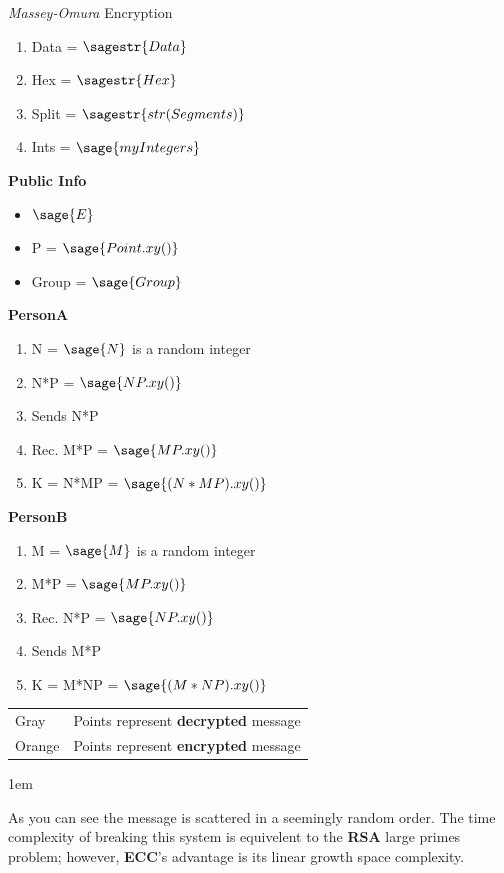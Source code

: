 \documentclass[a0,portrait]{a0poster}
\begin{document}
\begin{multicols}{2}
\begin{slide}{{\em Massey-Omura} Encryption}
\begin{enumerate}
  \item Data = \(\sagestr{Data}\)
  \item Hex =  \(\sagestr{Hex}\)
  \item Split =  \(\sagestr{str(Segments)}\)
  \item Ints = \(\sage{myIntegers}\)
\end{enumerate}
{\bf Public Info}
\begin{itemize}
\item $ \sage{E} $
\item P = $\sage{Point.xy()}$
\item Group = $\sage{Group}$
\end{itemize}
\begin{multicols}{2}
{\bf PersonA}
{\normalsize
\begin{enumerate}
\item N = $\sage{N}$ is a random integer
\item N*P = $\sage{NP.xy()}$
\item Sends N*P
\item Rec. M*P = $\sage{MP.xy()}$
\item K = N*MP =  $\sage{(N*MP).xy()}$
\end{enumerate}}
{\bf PersonB}
{\normalsize
\begin{enumerate}
\item M = $\sage{M}$ is a random integer
\item M*P = $\sage{MP.xy()}$
\item Rec. N*P = $\sage{NP.xy()}$
\item Sends M*P
\item K = M*NP = $\sage{(M*NP).xy()}$
\end{enumerate}}

\end{multicols}


\begin{center}
\begin{tabular}{l l}
{\color{Red} Gray} & Points represent {\bf decrypted} message\\
{\color{Purple} Orange} & Points represent {\bf encrypted} message
\end{tabular}
\end{center}
\parskip 1em


As you can see the message is scattered in a seemingly random order. The time complexity of breaking this system is equivelent to the {\bf RSA} large primes problem; however, {\bf ECC}'s advantage is its linear growth space complexity.
\end{slide}
\end{multicols}
\end{document}
